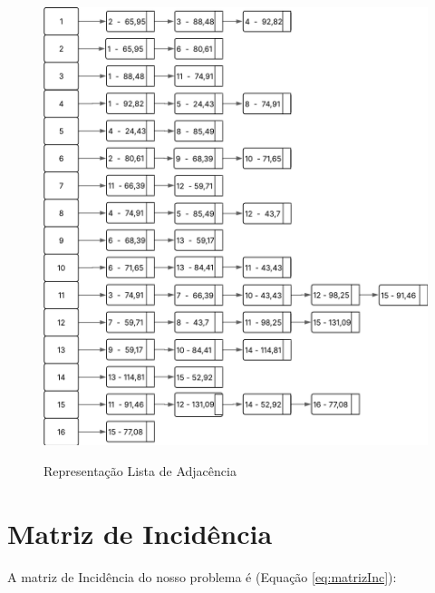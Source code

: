 \begin{figure} [H]
	\centering
	\caption{Representação Lista de Adjacência}%
	\label{fig:grafListaAdj}%
	\includegraphics[width=1\linewidth,angle=0]{figuras/grafoListaAdj.png}%
	\\
\end{figure}

\section{Matriz de Incidência}\label{sec:incidencia}

A matriz de Incidência do nosso problema é (Equação \ref{eq:matrizInc}):

